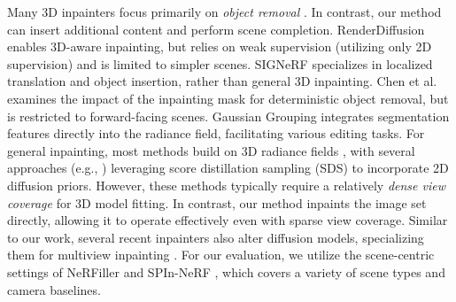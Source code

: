 Many 3D inpainters focus primarily on \textit{object removal} \cite{wang2025learning,lu2024view,spinnerf,weder2023removing,wang2024innerf360}.
In contrast, our method can insert additional content and perform scene completion.
RenderDiffusion \cite{anciukevivcius2023renderdiffusion} enables 3D-aware inpainting, but relies on weak supervision (utilizing only 2D supervision) and is limited to simpler scenes.
SIGNeRF \cite{dihlmann2024signerf} specializes in localized translation and object insertion, rather than general 3D inpainting. 
Chen et al.~\cite{chen2025single} examines the impact of the inpainting mask for deterministic object removal, but is restricted to forward-facing scenes.
Gaussian Grouping \cite{ye2023gaussian} integrates segmentation features directly into the radiance field, facilitating various editing tasks.
For general inpainting, most methods build on 3D radiance fields
\cite{chen2024mvip,mirzaei2024reffusion,prabhu2023inpaint3d,liu2024infusion,lin2025taming}, with several approaches (e.g., \cite{mirzaei2024reffusion,prabhu2023inpaint3d,chen2024mvip})
leveraging score distillation sampling (SDS) \cite{poole2022dreamfusion,wang2023score} to incorporate 2D diffusion priors.
However, these methods typically require a relatively \emph{dense view coverage} for 3D model fitting.
In contrast, our method inpaints the image set directly, allowing it to operate effectively even with sparse view coverage.
Similar to our work, several recent inpainters also alter diffusion models, 
specializing them for multiview inpainting \cite{cao2024mvinpainter,mirzaei2024reffusion}.
For our evaluation, we utilize the scene-centric settings of
NeRFiller \cite{weber2024nerfiller} and SPIn-NeRF \cite{spinnerf},
which covers %
a variety of scene types and camera baselines.


